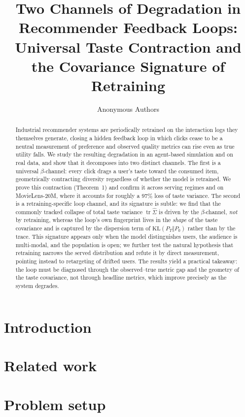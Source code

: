 \documentclass{article} %
\title{Two Channels of Degradation in Recommender Feedback Loops:\\
Universal Taste Contraction and the Covariance Signature of Retraining}
\author{Anonymous Authors}
\begin{document}
\maketitle

\begin{abstract}
Industrial recommender systems are periodically retrained on the interaction
logs they themselves generate, closing a hidden feedback loop in which clicks
cease to be a neutral measurement of preference and observed quality metrics can
rise even as true utility falls. We study the resulting degradation in an
agent-based simulation and on real data, and show that it decomposes into two
distinct channels. The first is a universal $\beta$-channel: every click drags a
user's taste toward the consumed item, geometrically contracting diversity
regardless of whether the model is retrained. We prove this contraction
(Theorem~1) and confirm it across serving regimes and on MovieLens-20M, where it
accounts for roughly a $97\%$ loss of taste variance. The second is a
retraining-specific loop channel, and its signature is subtle: we find that the
commonly tracked collapse of total taste variance $\operatorname{tr}\hat\Sigma$
is driven by the $\beta$-channel, \emph{not} by retraining, whereas the loop's
own fingerprint lives in the \emph{shape} of the taste covariance and is captured
by the dispersion term of $\mathrm{KL}(P_T\Vert P_0)$ rather than by the trace.
This signature appears only when the model distinguishes users, the audience is
multi-modal, and the population is open; we further test the natural hypothesis
that retraining narrows the served distribution and refute it by direct
measurement, pointing instead to retargeting of drifted users. The results yield
a practical takeaway: the loop must be diagnosed through the observed--true
metric gap and the geometry of the taste covariance, not through headline
metrics, which improve precisely as the system degrades.
\end{abstract}

\section{Introduction}

\section{Related work}

\section{Problem setup}
\end{document}

